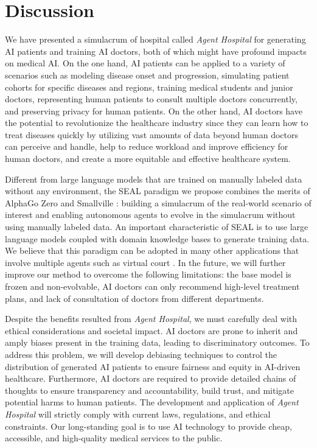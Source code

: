 \documentclass[fleqn,12pt]{wlscirep}
\begin{document}
\section*{Discussion}
We have presented a simulacrum of hospital called {\it Agent Hospital} for generating AI patients and training AI doctors, both of which might have profound impacts on medical AI. 
On the one hand, AI patients can be applied to a variety of scenarios such as modeling disease onset and progression, simulating patient cohorts for specific diseases and regions, training medical students and junior doctors, representing human patients to consult multiple doctors concurrently, and preserving privacy for human patients.
On the other hand, AI doctors have the potential to revolutionize the healthcare industry since they can learn how to treat diseases quickly  by utilizing vast amounts of data beyond human doctors can perceive and handle, help to reduce workload and improve efficiency for human doctors, and create a more equitable and effective healthcare system.

Different from large language models that are trained on manually labeled data without any environment, the SEAL paradigm we propose combines the merits of AlphaGo Zero \cite{Silver:17:AlphaGo-Zero} and Smallville \cite{Park:23:Smallville}: building a simulacrum of the real-world scenario of interest and enabling autonomous agents to evolve in the simulacrum without using manually labeled data. An important characteristic of SEAL is to use large language models coupled with domain knowledge bases to generate training data. We believe that this paradigm can be adopted in many other applications that involve multiple agents such as virtual court \cite{Chen:24:AgentCourt}. In the future, we will further improve our method to overcome the following limitations: the base model is frozen and non-evolvable, AI doctors can only recommend high-level treatment plans, and lack of consultation of doctors from different departments.

Despite the benefits resulted from {\it Agent Hospital}, we must carefully deal with ethical considerations and societal impact. AI doctors are prone to inherit and amply biases present in the training data, leading to discriminatory outcomes. To address this problem, we will develop debiasing techniques to control the distribution of generated AI patients to ensure fairness and equity in AI-driven healthcare. Furthermore, AI doctors are required to provide detailed chains of thoughts to ensure transparency and accountability, build trust, and mitigate potential harms to human patients. The development and application of {\it Agent Hospital} will strictly comply with current laws, regulations, and ethical constraints. Our long-standing goal is to use AI technology to provide cheap, accessible, and high-quality medical services to the public.
\end{document}
